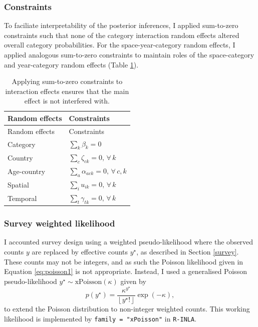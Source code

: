 \documentclass[a4paper, nobind]{templates/ociamthesis}
\begin{document}
\hypertarget{constraints}{%
\subsubsection{Constraints}\label{constraints}}

To faciliate interpretability of the posterior inferences, I applied sum-to-zero constraints such that none of the category interaction random effects altered overall category probabilities.
For the space-year-category random effects, I applied analogous sum-to-zero constraints to maintain roles of the space-category and year-category random effects (Table \ref{tab:constraints}).

\begin{longtable}[]{@{}ll@{}}
\caption{\label{tab:constraints} Applying sum-to-zero constraints to interaction effects ensures that the main effect is not interfered with.}\tabularnewline
\toprule\noalign{}
Random effects & Constraints \\
\midrule\noalign{}
\endfirsthead
\toprule\noalign{}
Random effects & Constraints \\
\midrule\noalign{}
\endhead
\bottomrule\noalign{}
\endlastfoot
Category & \(\sum_k \beta_k = 0\) \\
Country & \(\sum_c \zeta_{ck} = 0, \, \forall \, k\) \\
Age-country & \(\sum_a \alpha_{ack} = 0, \, \forall \, c, k\) \\
Spatial & \(\sum_i u_{ik} = 0, \, \forall \, k\) \\
Temporal & \(\sum_t \gamma_{tk} = 0, \, \forall \, k\) \\
\end{longtable}

\hypertarget{survey-weighted-likelihood}{%
\subsubsection{Survey weighted likelihood}\label{survey-weighted-likelihood}}

I accounted survey design using a weighted pseudo-likelihood where the observed counts \(y\) are replaced by effective counts \(y^\star\), as described in Section \ref{survey}.
These counts may not be integers, and as such the Poisson likelihood given in Equation \eqref{eq:poisson1} is not appropriate.
Instead, I used a generalised Poisson pseudo-likelihood \(y^\star \sim \text{xPoisson}(\kappa)\) given by
\begin{equation}
    p(y^\star) = \frac{\kappa^{y^\star}}{\left \lfloor{y^\star!}\right \rfloor } \exp \left(- \kappa \right),
\end{equation}
to extend the Poisson distribution to non-integer weighted counts.
This working likelihood is implemented by \texttt{family\ =\ "xPoisson"} in \texttt{R-INLA}.
\end{document}
